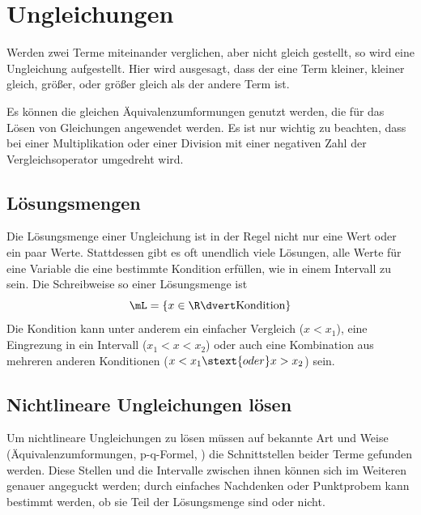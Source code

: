 \documentclass{article}
\begin{document}
\section{Ungleichungen}
Werden zwei Terme miteinander verglichen, aber nicht gleich gestellt, so wird eine Ungleichung aufgestellt. Hier wird ausgesagt, dass der eine Term kleiner, kleiner gleich, größer, oder größer gleich als der andere Term ist.

Es können die gleichen Äquivalenzumformungen genutzt werden, die für das Lösen von Gleichungen angewendet werden. Es ist nur wichtig zu beachten, dass bei einer Multiplikation oder einer Division mit einer negativen Zahl der Vergleichsoperator umgedreht wird.

\subsection{Lösungsmengen}
Die Lösungsmenge einer Ungleichung ist in der Regel nicht nur eine Wert oder ein paar Werte. Stattdessen gibt es oft unendlich viele Lösungen, alle Werte für eine Variable die eine bestimmte Kondition erfüllen, wie in einem Intervall zu sein. Die Schreibweise so einer Lösungsmenge ist 
\[
 \mL = \{x \in \R \dvert \text{Kondition}\}
\]
Die Kondition kann unter anderem ein einfacher Vergleich (\zb $x < x_1$), eine Eingrezung in ein Intervall (\zb $x_1 < x < x_2$) oder auch eine Kombination aus mehreren anderen Konditionen (\zb $x < x_1 \stext{oder} x > x_2$) sein.

\subsection{Nichtlineare Ungleichungen lösen}
Um nichtlineare Ungleichungen zu lösen müssen auf bekannte Art und Weise (Äquivalenzumformungen, p-q-Formel, \etc) die Schnittstellen beider Terme gefunden werden. Diese Stellen und die Intervalle zwischen ihnen können sich im Weiteren genauer angeguckt werden; durch einfaches Nachdenken oder Punktprobem kann bestimmt werden, ob sie Teil der Lösungsmenge sind oder nicht. 
\end{document}
